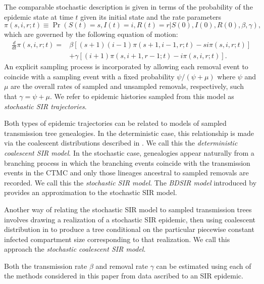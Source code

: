 \documentclass[12pt,titlepage]{article}
\newcommand{\St}{\mathcal{S}}
\newcommand{\It}{\mathcal{I}}
\newcommand{\Rt}{\mathcal{R}}
\begin{document}
The comparable stochastic description is given in terms of the probability
of the epidemic state at time $t$ given its initial state and the rate parameters
\begin{equation}
\pi(s,i,r;t) \equiv \Pr(S(t)=s, I(t)=i, R(t)=r|S(0),I(0),R(0),\beta,\gamma),
\end{equation}
which are governed by the following equation of motion:
\begin{align}
\frac{d}{dt}\pi(s,i,r;t)=&\beta\left[(s+1)(i-1)\pi(s+1,i-1,r;t)-si\pi(s,i,r;t)\right]\nonumber\\
&+\gamma\left[(i+1)\pi(s,i+1,r-1;t)-i\pi(s,i,r;t)\right].
\label{eq:SIRME}
\end{align}
An explicit sampling process is incorporated by allowing each removal
event to coincide with a sampling event with a fixed probability
$\psi/(\psi+\mu)$ where $\psi$ and $\mu$ are the overall rates of
sampled and unsampled removals, respectively, such that
$\gamma=\psi+\mu$. We refer to epidemic histories sampled from this
model as \emph{stochastic SIR trajectories}.

Both types of epidemic trajectories can be related to models of sampled transmission tree
genealogies. In the deterministic case, this relationship is made via
the coalescent distributions described in %
\cite{Volz:2012}. We call this the
\emph{deterministic coalescent SIR model}.  In the stochastic case,
genealogies appear naturally from a branching process in which the
branching events coincide with the transmission events in the CTMC and
only those lineages ancestral to sampled removals are recorded. We
call this the \emph{stochastic SIR model}.  The \emph{BDSIR model} introduced by
\cite{Kuhnert:2014} provides an approximation to the stochastic
SIR model.

Another way of relating the stochastic SIR model to sampled
transmission trees involves drawing a realization of a stochastic SIR
epidemic, then using coalescent distribution in \cite{Volz:2012} to
produce a tree conditional on the particular piecewise constant
infected compartment size corresponding to that realization.  We call
this approach the \emph{stochastic coalescent SIR model}.

Both the transmission rate $\beta$ and removal rate $\gamma$ can be
estimated using each of the methods considered in this paper from data
ascribed to an SIR epidemic.

\end{document}
